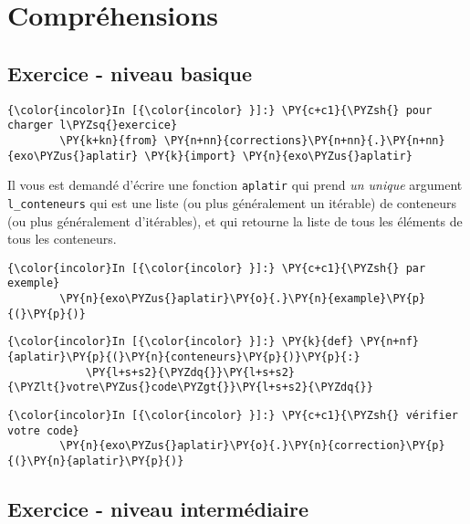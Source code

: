     \hypertarget{compruxe9hensions}{%
\section{Compréhensions}\label{compruxe9hensions}}

    \hypertarget{exercice---niveau-basique}{%
\subsection{Exercice - niveau basique}\label{exercice---niveau-basique}}

    \begin{Verbatim}[commandchars=\\\{\}]
{\color{incolor}In [{\color{incolor} }]:} \PY{c+c1}{\PYZsh{} pour charger l\PYZsq{}exercice}
        \PY{k+kn}{from} \PY{n+nn}{corrections}\PY{n+nn}{.}\PY{n+nn}{exo\PYZus{}aplatir} \PY{k}{import} \PY{n}{exo\PYZus{}aplatir}
\end{Verbatim}


    Il vous est demandé d'écrire une fonction \texttt{aplatir} qui prend
\emph{un unique} argument \texttt{l\_conteneurs} qui est une liste (ou
plus généralement un itérable) de conteneurs (ou plus généralement
d'itérables), et qui retourne la liste de tous les éléments de tous les
conteneurs.

    \begin{Verbatim}[commandchars=\\\{\}]
{\color{incolor}In [{\color{incolor} }]:} \PY{c+c1}{\PYZsh{} par exemple}
        \PY{n}{exo\PYZus{}aplatir}\PY{o}{.}\PY{n}{example}\PY{p}{(}\PY{p}{)}
\end{Verbatim}


    \begin{Verbatim}[commandchars=\\\{\}]
{\color{incolor}In [{\color{incolor} }]:} \PY{k}{def} \PY{n+nf}{aplatir}\PY{p}{(}\PY{n}{conteneurs}\PY{p}{)}\PY{p}{:}
            \PY{l+s+s2}{\PYZdq{}}\PY{l+s+s2}{\PYZlt{}votre\PYZus{}code\PYZgt{}}\PY{l+s+s2}{\PYZdq{}}
\end{Verbatim}


    \begin{Verbatim}[commandchars=\\\{\}]
{\color{incolor}In [{\color{incolor} }]:} \PY{c+c1}{\PYZsh{} vérifier votre code}
        \PY{n}{exo\PYZus{}aplatir}\PY{o}{.}\PY{n}{correction}\PY{p}{(}\PY{n}{aplatir}\PY{p}{)}
\end{Verbatim}


    \hypertarget{exercice---niveau-intermuxe9diaire}{%
\subsection{Exercice - niveau
intermédiaire}\label{exercice---niveau-intermuxe9diaire}}

